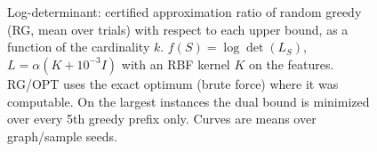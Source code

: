 \begin{figure}[t]
\centering
\setlength{\rgplotwidth}{0.245\textwidth}
\\[1pt]
\hfill
\hfill
\hfill
\\

\caption{Log-determinant: certified approximation ratio of random greedy (RG, mean over trials) with respect to each upper bound, as a function of the cardinality $k$. $f(S)=\log\det(L_S)$, $L=\alpha(K+10^{-3}I)$ with an RBF kernel $K$ on the features. RG/OPT uses the exact optimum (brute force) where it was computable. On the largest instances the dual bound is minimized over every 5th greedy prefix only. Curves are means over graph/sample seeds.}
\label{fig:rg-log_det-wide}
\end{figure}
